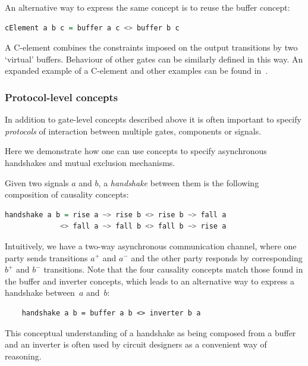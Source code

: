 \documentclass[british,conference,compsoc]{IEEEtran}
\begin{document}
An alternative way to express the same concept is to reuse the buffer concept:

\begin{lstlisting}[language=haskell]
    cElement a b c = buffer a c <> buffer b c
\end{lstlisting}

A C-element combines the constraints imposed on the output
transitions by two `virtual' buffers. Behaviour of other gates can be similarly
defined in this way. An expanded example of a C-element and other examples can 
be found in~\cite{2015_Beaumont_MEMOCODE}.

\vspace{-2mm}

\subsubsection{Protocol-level concepts} In addition to gate-level concepts
described above it is often important to specify \emph{protocols}
of interaction between multiple gates, components or signals. 

Here we demonstrate how one can use concepts to specify asynchronous handshakes
and mutual exclusion mechanisms.

Given two signals $a$ and $b$, a \emph{handshake} between them is
the following composition of causality concepts:

\begin{lstlisting}[language=haskell]
handshake a b = rise a ~> rise b <> rise b ~> fall a 
             <> fall a ~> fall b <> fall b ~> rise a
\end{lstlisting}

Intuitively, we have a two-way asynchronous communication channel,
where one party sends transitions $a^{+}$ and $a^{-}$ and the other
party responds by corresponding $b^{+}$ and $b^{-}$ transitions.
Note that the four causality concepts match those found
in the buffer and inverter concepts, which leads to an alternative
way to express a handshake between~$a$ and~$b$:

\begin{lstlisting}
    handshake a b = buffer a b <> inverter b a
\end{lstlisting}

This conceptual understanding of a handshake as being composed
from a buffer and an inverter is often used by circuit designers as
a convenient way of reasoning.

\vspace{-2mm}
\end{document}
